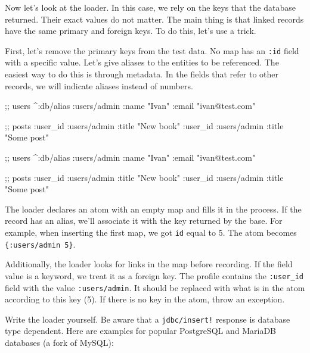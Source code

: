 Now let's look at the loader. In this case, we rely on the keys that the database returned. Their exact values do not matter. The main thing is that linked records have the same primary and foreign keys. To do this, let's use a trick.

First, let's remove the primary keys from the test data. No map has an \verb|:id| field with a specific value. Let's give aliases to the entities to be referenced. The easiest way to do this is through metadata. In the fields that refer to other records, we will indicate aliases instead of numbers.


\ifx\DEVICETYPE\MOBILE

\begin{english}
  \begin{clojure}
;; users
^{:db/alias :users/admin}
 {:name "Ivan" :email "ivan@test.com"}

;; posts
{:user_id :users/admin
 :title "New book"}
{:user_id :users/admin
 :title "Some post"}
  \end{clojure}
\end{english}

\else

\begin{english}
  \begin{clojure}
;; users
^{:db/alias :users/admin}
 {:name "Ivan" :email "ivan@test.com"}

;; posts
{:user_id :users/admin :title "New book"}
{:user_id :users/admin :title "Some post"}
  \end{clojure}
\end{english}

\fi

The loader declares an atom with an empty map and fills it in the process. If the record has an alias, we'll associate it with the key returned by the base. For example, when inserting the first map, we got \verb|id| equal to 5. The atom becomes \verb|{:users/admin 5}|.

Additionally, the loader looks for links in the map before recording. If the field value is a keyword, we treat it as a foreign key. The profile contains the \verb|:user_id| field with the value \verb|:users/admin|. It should be replaced with what is in the atom according to this key (5). If there is no key in the atom, throw an exception.


Write the loader yourself. Be aware that a \verb|jdbc/insert!| response is database type dependent. Here are examples for popular PostgreSQL and MariaDB databases (a fork of MySQL):

